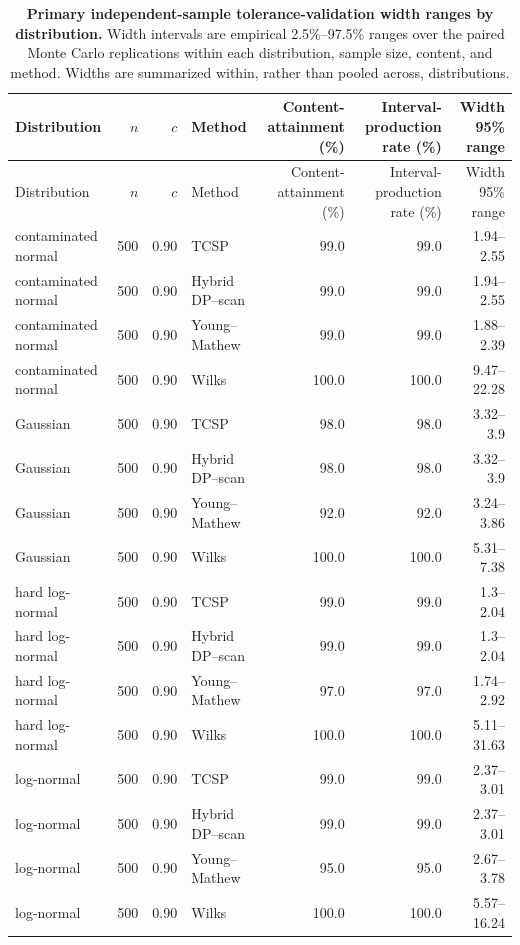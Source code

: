 \begingroup
\scriptsize
\begin{longtable}{@{}p{}rrp{}rrr@{}}
\caption{\textbf{Primary independent-sample tolerance-validation width ranges by distribution.} Width intervals are empirical 2.5\%--97.5\% ranges over the paired Monte Carlo replications within each distribution, sample size, content, and method. Widths are summarized within, rather than pooled across, distributions.}\label{tab:supp-primary-dgp-width-ranges}\\
\toprule
Distribution & \(n\) & \(c\) & Method & Content-attainment (\%) & Interval-production rate (\%) & Width 95\% range\\
\midrule
\endfirsthead
\toprule
Distribution & \(n\) & \(c\) & Method & Content-attainment (\%) & Interval-production rate (\%) & Width 95\% range\\
\midrule
\endhead
contaminated normal & 500 & 0.90 & TCSP & 99.0 & 99.0 & 1.94--2.55 \\
contaminated normal & 500 & 0.90 & Hybrid DP--scan & 99.0 & 99.0 & 1.94--2.55 \\
contaminated normal & 500 & 0.90 & Young--Mathew & 99.0 & 99.0 & 1.88--2.39 \\
contaminated normal & 500 & 0.90 & Wilks & 100.0 & 100.0 & 9.47--22.28 \\
Gaussian & 500 & 0.90 & TCSP & 98.0 & 98.0 & 3.32--3.9 \\
Gaussian & 500 & 0.90 & Hybrid DP--scan & 98.0 & 98.0 & 3.32--3.9 \\
Gaussian & 500 & 0.90 & Young--Mathew & 92.0 & 92.0 & 3.24--3.86 \\
Gaussian & 500 & 0.90 & Wilks & 100.0 & 100.0 & 5.31--7.38 \\
hard log-normal & 500 & 0.90 & TCSP & 99.0 & 99.0 & 1.3--2.04 \\
hard log-normal & 500 & 0.90 & Hybrid DP--scan & 99.0 & 99.0 & 1.3--2.04 \\
hard log-normal & 500 & 0.90 & Young--Mathew & 97.0 & 97.0 & 1.74--2.92 \\
hard log-normal & 500 & 0.90 & Wilks & 100.0 & 100.0 & 5.11--31.63 \\
log-normal & 500 & 0.90 & TCSP & 99.0 & 99.0 & 2.37--3.01 \\
log-normal & 500 & 0.90 & Hybrid DP--scan & 99.0 & 99.0 & 2.37--3.01 \\
log-normal & 500 & 0.90 & Young--Mathew & 95.0 & 95.0 & 2.67--3.78 \\
log-normal & 500 & 0.90 & Wilks & 100.0 & 100.0 & 5.57--16.24 \\

\end{longtable}
